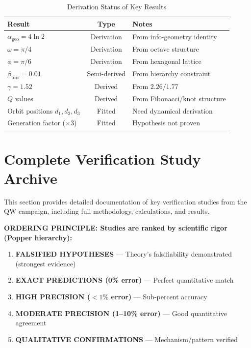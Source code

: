 \documentclass[11pt, a4paper]{article}
\theoremstyle{remark}
\newcommand{\alphageo}{\alpha_{\text{geo}}}
\newcommand{\betators}{\beta_{\text{tors}}}
\begin{document}
\begin{table}[H]
\centering
\caption{Derivation Status of Key Results}
\begin{tabular}{|l|c|p{5cm}|}
\hline
\textbf{Result} & \textbf{Type} & \textbf{Notes} \\
\hline
$\alphageo = 4\ln 2$ & Derivation & From info-geometry identity \\
$\omega = \pi/4$ & Derivation & From octave structure \\
$\phi = \pi/6$ & Derivation & From hexagonal lattice \\
$\betators = 0.01$ & Semi-derived & From hierarchy constraint \\
$\gamma = 1.52$ & Derived & From $2.26 / 1.77$ \\
$Q$ values & Derived & From Fibonacci/knot structure \\
Orbit positions $d_1, d_2, d_3$ & Fitted & Need dynamical derivation \\
Generation factor ($\times 3$) & Fitted & Hypothesis not proven \\
\hline
\end{tabular}
\end{table}

\part{Complete Verification Study Archive}

This section provides detailed documentation of key verification studies from the QW campaign, including full methodology, calculations, and results.

\textbf{ORDERING PRINCIPLE: Studies are ranked by scientific rigor (Popper hierarchy):}
\begin{enumerate}
    \item \textbf{FALSIFIED HYPOTHESES} --- Theory's falsifiability demonstrated (strongest evidence)
    \item \textbf{EXACT PREDICTIONS (0\% error)} --- Perfect quantitative match
    \item \textbf{HIGH PRECISION ($<1\%$ error)} --- Sub-percent accuracy
    \item \textbf{MODERATE PRECISION (1--10\% error)} --- Good quantitative agreement
    \item \textbf{QUALITATIVE CONFIRMATIONS} --- Mechanism/pattern verified
\end{enumerate}

\end{document}
